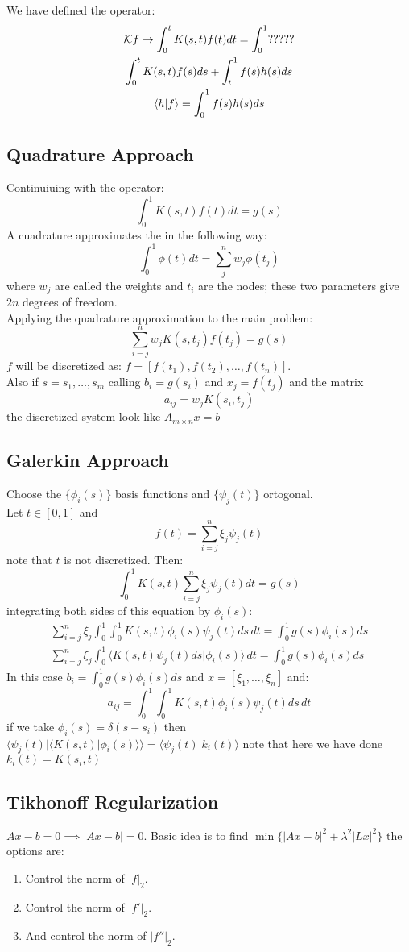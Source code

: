 We have defined the operator:
\begin{gather*}
\mathbf{\mathcal{K}} f\to \int_0^t K(s,t)f(t) dt = \int_0^1 ?????\\
\int_0^t K(s,t) f(s)ds + \int_t^1 f(s)h(s)ds \\
\langle h | f \rangle = \int_0^1 f(s)h(s)ds
\end{gather*}

\subsection{Quadrature Approach}
Continuiuing with the operator:
$$\int_0^1 K(s,t)f(t) dt = g(s)$$
A cuadrature approximates the in the following way:
$$\int_0^1 \phi(t)dt = \sum_j^n w_j \phi(t_j)$$
where $w_j$ are called the weights and $t_i$ are the nodes; these two parameters give $2n$ degrees of freedom.\\
Applying the quadrature approximation to the main problem:
$$ \sum_{i=j}^n w_j K(s,t_j)f(t_j) = g(s)$$
$f$ will be discretized as: $f=[f(t_1),f(t_2),\ldots,f(t_n)]$.\\
Also if $s=s_1,\ldots,s_m$ calling $b_i=g(s_i)$ and $x_j=f(t_j)$ and the matrix $$a_{ij}= w_j K(s_i,t_j)$$ the discretized system look like $A_{m\times n}x=b$
\subsection{Galerkin Approach}
Choose the $\{\phi_i(s)\}$ basis functions and $\{\psi_j(t)\}$ ortogonal.\\
Let $t\in [0,1]$ and $$f(t) = \sum_{i=j}^n \xi_j\psi_j(t)$$ note that $t$ is not discretized. Then:
$$\int_0^1 K(s,t)\sum_{i=j}^n \xi_j\psi_j(t)dt=g(s)$$
integrating both sides of this equation by $\phi_i(s)$:
\begin{gather*}
\sum_{i=j}^n \xi_j \int_0^1\int_0^1 K(s,t) \phi_i(s) \psi_j(t)ds\, dt= \int_0^1 g(s)\phi_i(s)ds\\
\sum_{i=j}^n \xi_j \int_0^1\langle  K(s,t)\psi_j(t)ds| \phi_i(s) \rangle \, dt= \int_0^1 g(s)\phi_i(s)ds
\end{gather*}
In this case $b_i=\int_0^1 g(s)\phi_i(s)ds$ and $x=[\xi_1,\ldots,\xi_n]$ and:
$$a_{ij} = \int_0^1\int_0^1 K(s,t) \phi_i(s) \psi_j(t)ds\, dt$$
if we take $\phi_i(s)=\delta(s-s_i)$ then $\langle \psi_j(t) | \langle K(s,t)|\phi_i(s)\rangle \rangle = \langle\psi_j(t) | k_i(t)\rangle$ note that here we have done $k_i(t)=K(s_i,t)$

\subsection{Tikhonoff Regularization}
$Ax-b=0\implies |Ax-b|=0$. Basic idea is to find $\min\{|Ax-b|^2 + \lambda^2 |Lx|^2 \}$ the options are: 
\begin{enumerate}[1)]
    \item Control the norm of $|f|_2$. 
    \item Control the norm of $|f'|_2$. 
    \item And control the norm of $|f''|_2$.\\
\end{enumerate}



